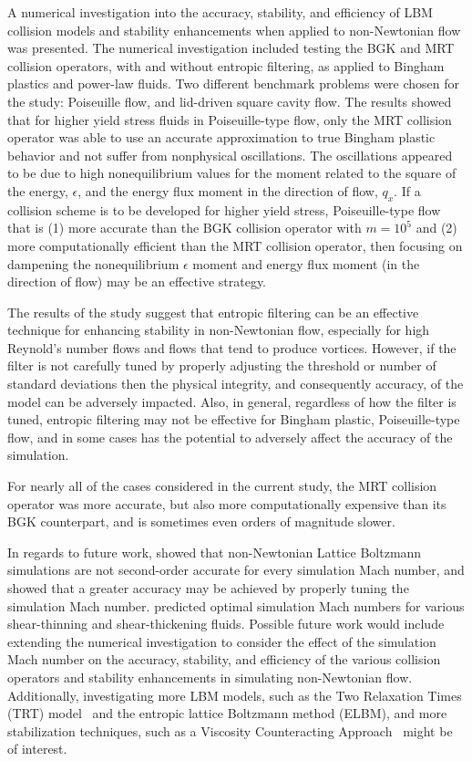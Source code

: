 A numerical investigation into the accuracy, stability, and efficiency of LBM collision models and stability enhancements when applied to non-Newtonian flow was presented.
The numerical investigation included testing the BGK and MRT collision operators, with and without entropic filtering, as applied to Bingham plastics and power-law fluids.
Two different benchmark problems were chosen for the study: Poiseuille flow, and lid-driven square cavity flow.
The results showed that for higher yield stress fluids in Poiseuille-type flow, only the MRT collision operator was able to use an accurate approximation to true Bingham plastic behavior and not suffer from nonphysical oscillations.
The oscillations appeared to be due to high nonequilibrium values for the moment related to the square of the energy, $\epsilon$, and the energy flux moment in the direction of flow, $q_x$.
If a collision scheme is to be developed for higher yield stress, Poiseuille-type flow that is (1) more accurate than the BGK collision operator with $m = 10^5$ and (2) more computationally efficient than the MRT collision operator, then focusing on dampening the nonequilibrium $\epsilon$ moment and energy flux moment (in the direction of flow) may be an effective strategy.

The results of the study suggest that entropic filtering can be an effective technique for enhancing stability in non-Newtonian flow, especially for high Reynold's number flows and flows that tend to produce vortices.
However, if the filter is not carefully tuned by properly adjusting the threshold or number of standard deviations then the physical integrity, and consequently accuracy, of the model can be adversely impacted.
Also, in general, regardless of how the filter is tuned, entropic filtering may not be effective for Bingham plastic, Poiseuille-type flow, and in some cases has the potential to adversely affect the accuracy of the simulation.

For nearly all of the cases considered in the current study, the MRT collision operator was more accurate, but also more computationally expensive than its BGK counterpart, and is sometimes even orders of magnitude slower.

In regards to future work, \cite{conrad2015accuracy} showed that non-Newtonian Lattice Boltzmann simulations are not second-order accurate for every simulation Mach number, and showed that a greater accuracy may be achieved by properly tuning the simulation Mach number.
\cite{conrad2015accuracy} predicted optimal simulation Mach numbers for various shear-thinning and shear-thickening fluids. 
Possible future work would include extending the numerical investigation to consider the effect of the simulation Mach number on the accuracy, stability, and efficiency of the various collision operators and stability enhancements in simulating non-Newtonian flow.
Additionally, investigating more LBM models, such as the Two Relaxation Times (TRT) model~\cite{ginzburg2010optimal} and the entropic lattice Boltzmann method (ELBM), and more stabilization techniques, such as a Viscosity Counteracting Approach~\cite{zhang2016improving} might be of interest.
